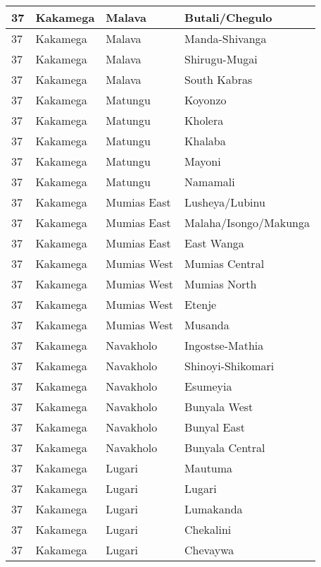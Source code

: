\begin{table}[!ht]
\begin{tabular}{|l|l|l|l|}
        37 & Kakamega & Malava & Butali/Chegulo \\ \hline
        37 & Kakamega & Malava & Manda-Shivanga \\ \hline
        37 & Kakamega & Malava & Shirugu-Mugai \\ \hline
        37 & Kakamega & Malava & South Kabras \\ \hline
        37 & Kakamega & Matungu & Koyonzo \\ \hline
        37 & Kakamega & Matungu & Kholera \\ \hline
        37 & Kakamega & Matungu & Khalaba \\ \hline
        37 & Kakamega & Matungu & Mayoni \\ \hline
        37 & Kakamega & Matungu & Namamali \\ \hline
        37 & Kakamega & Mumias East & Lusheya/Lubinu \\ \hline
        37 & Kakamega & Mumias East & Malaha/Isongo/Makunga \\ \hline
        37 & Kakamega & Mumias East & East Wanga \\ \hline
        37 & Kakamega & Mumias West & Mumias Central \\ \hline
        37 & Kakamega & Mumias West & Mumias North \\ \hline
        37 & Kakamega & Mumias West & Etenje \\ \hline
        37 & Kakamega & Mumias West & Musanda \\ \hline
        37 & Kakamega & Navakholo & Ingostse-Mathia \\ \hline
        37 & Kakamega & Navakholo & Shinoyi-Shikomari \\ \hline
        37 & Kakamega & Navakholo & Esumeyia \\ \hline
        37 & Kakamega & Navakholo & Bunyala West \\ \hline
        37 & Kakamega & Navakholo & Bunyal East \\ \hline
        37 & Kakamega & Navakholo & Bunyala Central \\ \hline
        37 & Kakamega & Lugari & Mautuma \\ \hline
        37 & Kakamega & Lugari & Lugari \\ \hline
        37 & Kakamega & Lugari & Lumakanda \\ \hline
        37 & Kakamega & Lugari & Chekalini \\ \hline
        37 & Kakamega & Lugari & Chevaywa \\ \hline

\end{tabular}
\end{table}
